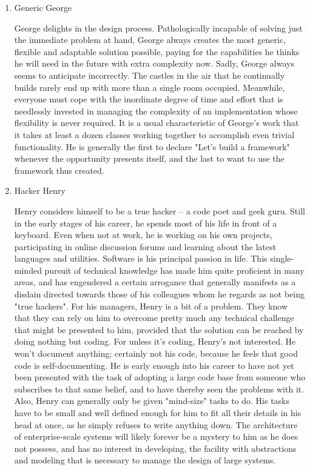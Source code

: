 \documentclass{article}
\begin{document}
\begin{enumerate}
\item Generic George
\label{sec:orgheadline10}

George delights in the design process. Pathologically incapable of
solving just the immediate problem at hand, George always creates the
most generic, flexible and adaptable solution possible, paying for the
capabilities he thinks he will need in the future with extra complexity
now. Sadly, George always seems to anticipate incorrectly. The castles
in the air that he continually builds rarely end up with more than a
single room occupied. Meanwhile, everyone must cope with the inordinate
degree of time and effort that is needlessly invested in managing the
complexity of an implementation whose flexibility is never required. It
is a usual characteristic of George's work that it takes at least a
dozen classes working together to accomplish even trivial functionality.
He is generally the first to declare "Let's build a framework" whenever
the opportunity presents itself, and the last to want to use the
framework thus created.

\item Hacker Henry
\label{sec:orgheadline11}

Henry considers himself to be a true hacker -- a code poet and geek
guru. Still in the early stages of his career, he spends most of his
life in front of a keyboard. Even when not at work, he is working on his
own projects, participating in online discussion forums and learning
about the latest languages and utilities. Software is his principal
passion in life. This single-minded pursuit of technical knowledge has
made him quite proficient in many areas, and has engendered a certain
arrogance that generally manifests as a disdain directed towards those
of his colleagues whom he regards as not being "true hackers". For his
managers, Henry is a bit of a problem. They know that they can rely on
him to overcome pretty much any technical challenge that might be
presented to him, provided that the solution can be reached by doing
nothing but coding. For unless it's coding, Henry's not interested. He
won't document anything; certainly not his code, because he feels that
good code is self-documenting. He is early enough into his career to
have not yet been presented with the task of adopting a large code base
from someone who subscribes to that same belief, and to have thereby
seen the problems with it. Also, Henry can generally only be given
"mind-size" tasks to do. His tasks have to be small and well defined
enough for him to fit all their details in his head at once, as he
simply refuses to write anything down. The architecture of
enterprise-scale systems will likely forever be a mystery to him as he
does not possess, and has no interest in developing, the facility with
abstractions and modeling that is necessary to manage the design of
large systems.


\end{enumerate}
\end{document}
